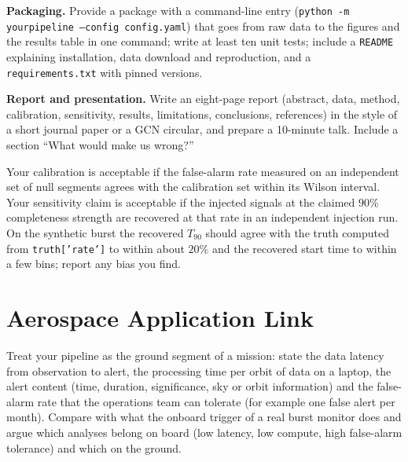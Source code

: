 \documentclass[11pt,a4paper]{article}
\begin{document}
\begin{tasks}
  \item \textbf{Packaging.} Provide a package with a command-line entry (\texttt{python -m yourpipeline --config config.yaml}) that goes from raw data to the figures and the results table in one command; write at least ten unit tests; include a \texttt{README} explaining installation, data download and reproduction, and a \texttt{requirements.txt} with pinned versions.
  \item \textbf{Report and presentation.} Write an eight-page report (abstract, data, method, calibration, sensitivity, results, limitations, conclusions, references) in the style of a short journal paper or a GCN circular, and prepare a 10-minute talk. Include a section ``What would make us wrong?''
\end{tasks}

\begin{checkpoint}
Your calibration is acceptable if the false-alarm rate measured on an independent set of null segments agrees with the calibration set within its Wilson interval. Your sensitivity claim is acceptable if the injected signals at the claimed $90\%$ completeness strength are recovered at that rate in an independent injection run. On the synthetic burst the recovered $T_{90}$ should agree with the truth computed from \texttt{truth['rate']} to within about $20\%$ and the recovered start time to within a few bins; report any bias you find.
\end{checkpoint}

\section*{Aerospace Application Link}
Treat your pipeline as the ground segment of a mission: state the data latency from observation to alert, the processing time per orbit of data on a laptop, the alert content (time, duration, significance, sky or orbit information) and the false-alarm rate that the operations team can tolerate (for example one false alert per month). Compare with what the onboard trigger of a real burst monitor does and argue which analyses belong on board (low latency, low compute, high false-alarm tolerance) and which on the ground.
\end{document}
